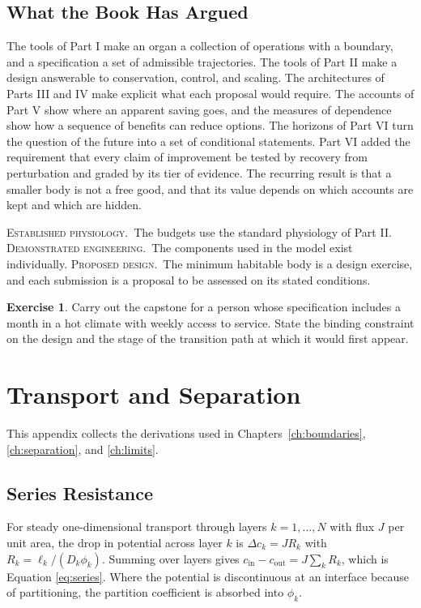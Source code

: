 \documentclass[11pt,openany]{book}
\theoremstyle{definition}
\newtheorem{exercise}{Exercise}[chapter]
\theoremstyle{remark}
\newcommand{\est}{\textsc{Established physiology.}\ }
\newcommand{\dem}{\textsc{Demonstrated engineering.}\ }
\newcommand{\pro}{\textsc{Proposed design.}\ }
\begin{document}
\section{What the Book Has Argued}

The tools of Part I make an organ a collection of operations with a boundary, and a specification a set of admissible trajectories. The tools of Part II make a design answerable to conservation, control, and scaling. The architectures of Parts III and IV make explicit what each proposal would require. The accounts of Part V show where an apparent saving goes, and the measures of dependence show how a sequence of benefits can reduce options. The horizons of Part VI turn the question of the future into a set of conditional statements. Part VI added the requirement that every claim of improvement be tested by recovery from perturbation and graded by its tier of evidence. The recurring result is that a smaller body is not a free good, and that its value depends on which accounts are kept and which are hidden.

\begin{evidence}
\est The budgets use the standard physiology of Part II. \dem The components used in the model exist individually. \pro The minimum habitable body is a design exercise, and each submission is a proposal to be assessed on its stated conditions.
\end{evidence}

\begin{exercise}
Carry out the capstone for a person whose specification includes a month in a hot climate with weekly access to service. State the binding constraint on the design and the stage of the transition path at which it would first appear.
\end{exercise}

\appendix

\chapter{Transport and Separation}
\label{app:transport}

This appendix collects the derivations used in Chapters~\ref{ch:boundaries}, \ref{ch:separation}, and \ref{ch:limits}.

\section{Series Resistance}

For steady one-dimensional transport through layers $k=1,\dots,N$ with flux $J$ per unit area, the drop in potential across layer $k$ is $\Delta c_k=JR_k$ with $R_k=\ell_k/(D_k\phi_k)$. Summing over layers gives $c_{\mathrm{in}}-c_{\mathrm{out}}=J\sum_kR_k$, which is Equation \eqref{eq:series}. Where the potential is discontinuous at an interface because of partitioning, the partition coefficient is absorbed into $\phi_k$.
\end{document}
